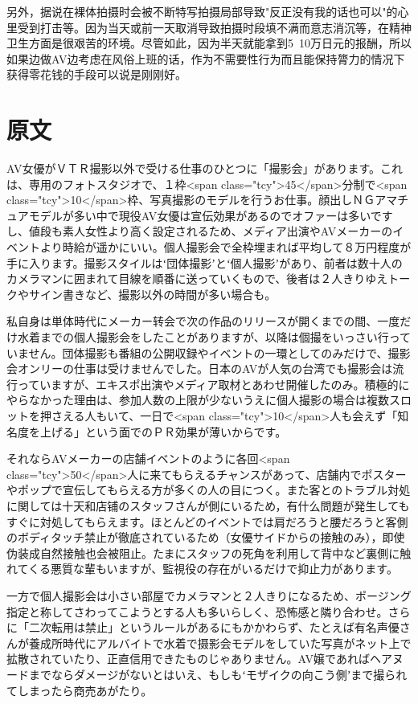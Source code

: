 \documentclass[12pt,UTF8]{ctexbook}
\begin{document}
另外，据说在裸体拍摄时会被不断特写拍摄局部导致"反正没有我的话也可以"的心里受到打击等。因为当天或前一天取消导致拍摄时段填不满而意志消沉等，在精神卫生方面是很艰苦的环境。尽管如此，因为半天就能拿到5~10万日元的报酬，所以如果边做AV边考虑在风俗上班的话，作为不需要性行为而且能保持膂力的情况下获得零花钱的手段可以说是刚刚好。

\switchcolumn

\section*{原文}

AV女優がＶＴＲ撮影以外で受ける仕事のひとつに「撮影会」があります。これは、専用のフォトスタジオで、１枠<span class="tcy">45</span>分制で<span class="tcy">10</span>枠、写真撮影のモデルを行うお仕事。顔出しＮＧアマチュアモデルが多い中で現役AV女優は宣伝効果があるのでオファーは多いですし、値段も素人女性より高く設定されるため、メディア出演やAVメーカーのイベントより時給が遥かにいい。個人撮影会で全枠埋まれば平均して８万円程度が手に入ります。撮影スタイルはʻ団体撮影ʼとʻ個人撮影ʼがあり、前者は数十人のカメラマンに囲まれて目線を順番に送っていくもので、後者は２人きりゆえトークやサイン書きなど、撮影以外の時間が多い場合も。

私自身は単体時代にメーカー转会で次の作品のリリースが開くまでの間、一度だけ水着までの個人撮影会をしたことがありますが、以降は個撮をいっさい行っていません。団体撮影も番組の公開収録やイベントの一環としてのみだけで、撮影会オンリーの仕事は受けませんでした。日本のAVが人気の台湾でも撮影会は流行っていますが、エキスポ出演やメディア取材とあわせ開催したのみ。積極的にやらなかった理由は、参加人数の上限が少ないうえに個人撮影の場合は複数スロットを押さえる人もいて、一日で<span class="tcy">10</span>人も会えず「知名度を上げる」という面でのＰＲ効果が薄いからです。

それならAVメーカーの店舗イベントのように各回<span class="tcy">50</span>人に来てもらえるチャンスがあって、店舗内でポスターやポップで宣伝してもらえる方が多くの人の目につく。また客とのトラブル対処に関しては十天和店铺のスタッフさんが側にいるため，有什么問題が発生してもすぐに対処してもらえます。ほとんどのイベントでは肩だろうと腰だろうと客側のボディタッチ禁止が徹底されているため（女優サイドからの接触のみ），即使伪装成自然接触也会被阻止。たまにスタッフの死角を利用して背中など裏側に触れてくる悪質な輩もいますが、監視役の存在がいるだけで抑止力があります。

一方で個人撮影会は小さい部屋でカメラマンと２人きりになるため、ポージング指定と称してさわってこようとする人も多いらしく、恐怖感と隣り合わせ。さらに「二次転用は禁止」というルールがあるにもかかわらず、たとえば有名声優さんが養成所時代にアルバイトで水着で摄影会モデルをしていた写真がネット上で拡散されていたり、正直信用できたものじゃありません。AV嬢であればヘアヌードまでならダメージがないとはいえ、もしもʻモザイクの向こう側ʼまで撮られてしまったら商売あがたり。
\end{document}
